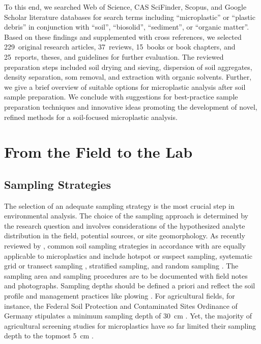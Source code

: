 To this end, we searched Web of Science, CAS SciFinder, Scopus, and Google Scholar literature databases for search terms including ``microplastic'' or ``plastic debris'' in conjunction with ``soil'', ``biosolid'', ``sediment'', or ``organic matter''. Based on these findings and supplemented with cross references, we selected 229~original research articles, 37~reviews, 15~books or book chapters, and 25~reports, theses, and guidelines for further evaluation.
The reviewed preparation steps included soil drying and sieving, dispersion of soil aggregates, density separation, \ac{som} removal, and extraction with organic solvents.
Further, we give a brief overview of suitable options for microplastic analysis after soil sample preparation. We conclude with suggestions for best-practice sample preparation techniques and innovative ideas promoting the development of novel, refined methods for a soil-focused microplastic analysis.

\section{From the Field to the Lab}
\label{sec:analytical-techniques:field-to-lab}

\subsection{Sampling Strategies}
\label{sec:analytical-techniques:sampling}

The selection of an adequate sampling strategy is the most crucial step in environmental analysis. The choice of the sampling approach is determined by the research question and involves considerations of the hypothesized analyte distribution in the field, potential sources, or site geomorphology. As recently reviewed by \citet{MollerFinding2020}, common soil sampling strategies in accordance with \citet{ISO18400-102Soil2017} are equally applicable to microplastics and include hotspot or suspect sampling, systematic grid or transect sampling \citep[as conducted by][]{PiehlIdentification2018}, stratified sampling, and random sampling \citep{CorradiniEvidence2019}. The sampling area and sampling procedures are to be documented with field notes and photographs.
Sampling depths should be defined a priori and reflect the soil profile and management practices like plowing \citep{SponagelBodenkundliche2005,ISO18400-102Soil2017}. For agricultural fields, for instance, the Federal Soil Protection and Contaminated Sites Ordinance of Germany stipulates a minimum sampling depth of \SI{30}{\centi\meter} \citep{BBodSchVFederal1999}. Yet, the majority of agricultural screening studies for microplastics have so far limited their sampling depth to the topmost \SI{5}{\centi\meter} \citep{LiuMicroplastic2018,PiehlIdentification2018}.

